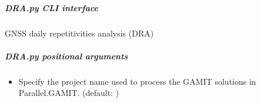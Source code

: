 \documentclass[letterpaper,10pt,english]{sphinxmanual}
\begin{document}
\subparagraph{DRA.py \sphinxhyphen{} CLI interface}
\label{\detokenize{pgamit.com:DRA.py---CLI-interface}}
\sphinxAtStartPar
GNSS daily repetitivities analysis (DRA)

\begin{sphinxVerbatim}[commandchars=\\\{\}]
 \PYG{p}{[}\PYG{p}{]} \PYG{p}{[}  \PYG{p}{[} \PYG{p}{]}\PYG{p}{]} \PYG{p}{[}  \PYG{p}{[} \PYG{p}{]}\PYG{p}{]} \PYG{p}{[}\PYG{p}{]} \PYG{p}{[}\PYG{p}{]} \PYG{p}{[}\PYG{p}{]}  
\end{sphinxVerbatim}


\subparagraph{DRA.py positional arguments}
\label{\detokenize{pgamit.com:DRA.py-positional-arguments}}\begin{itemize}
\item {} 
\sphinxAtStartPar
{\hyperref[\detokenize{pgamit.com:DRA.py-_project-name_}]{}} \sphinxhyphen{} Specify the project name used to process the GAMIT solutions in Parallel.GAMIT. (default: )

\end{itemize}
\end{document}
